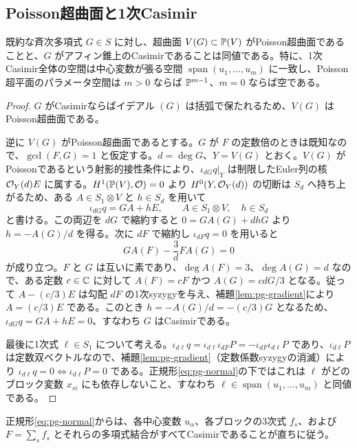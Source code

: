 \subsection{Poisson超曲面と1次Casimir}
\begin{proposition}\label{prop:pg-casimir}
既約な斉次多項式 $G\in S$ に対し、超曲面 $V(G)\subset\mathbb P(V)$ がPoisson超曲面であることと、$G$ がアフィン錐上のCasimirであることは同値である。特に、1次Casimir全体の空間は中心変数が張る空間 $\operatorname{span}(u_1,\ldots,u_m)$ に一致し、Poisson超平面のパラメータ空間は $m>0$ ならば $\mathbb P^{m-1}$、$m=0$ ならば空である。
\end{proposition}
\begin{proof}
$G$ がCasimirならばイデアル $(G)$ は括弧で保たれるため、$V(G)$ はPoisson超曲面である。

逆に $V(G)$ がPoisson超曲面であるとする。$G$ が $F$ の定数倍のときは既知なので、$\gcd(F,G)=1$ と仮定する。$d=\deg G$、$Y=V(G)$ とおく。$V(G)$ がPoissonであるという射影的接性条件により、$\iota_{dG}q|_Y$ は制限したEuler列の核 $\mathcal O_Y(d)E$ に属する。$H^1(\mathbb P(V),\mathcal O)=0$ より $H^0(Y,\mathcal O_Y(d))$ の切断は $S_d$ へ持ち上がるため、ある $A\in S_1\otimes V$ と $h\in S_d$ を用いて
\begin{equation}
\iota_{dG}q=GA+hE, \qquad A\in S_1\otimes V, \quad h\in S_d
\end{equation}
と書ける。この両辺を $dG$ で縮約すると $0=GA(G)+dhG$ より $h=-A(G)/d$ を得る。次に $dF$ で縮約し $\iota_{dF}q=0$ を用いると
\[
  GA(F)-\frac{3}{d}FA(G)=0
\]
が成り立つ。$F$ と $G$ は互いに素であり、$\deg A(F)=3$、$\deg A(G)=d$ なので、ある定数 $c\in\mathbb C$ に対して $A(F)=cF$ かつ $A(G)=cdG/3$ となる。従って $A-(c/3)E$ は勾配 $dF$ の1次syzygyを与え、補題\ref{lem:pg-gradient}により $A=(c/3)E$ である。このとき $h=-A(G)/d=-(c/3)G$ となるため、$\iota_{dG}q=GA+hE=0$、すなわち $G$ はCasimirである。

最後に1次式 $\ell\in S_1$ について考える。$\iota_{d\ell}q=\iota_{d\ell}\iota_{dF}P=-\iota_{dF}\iota_{d\ell}P$ であり、$\iota_{d\ell}P$ は定数双ベクトルなので、補題\ref{lem:pg-gradient}（定数係数syzygyの消滅）により $\iota_{d\ell}q=0\iff\iota_{d\ell}P=0$ である。正規形\eqref{eq:pg-normal}の下ではこれは $\ell$ がどのブロック変数 $x_{si}$ にも依存しないこと、すなわち $\ell\in\operatorname{span}(u_1,\ldots,u_m)$ と同値である。
\end{proof}

正規形\eqref{eq:pg-normal}からは、各中心変数 $u_\alpha$、各ブロックの3次式 $f_s$、および $F=\sum_s f_s$ とそれらの多項式結合がすべてCasimirであることが直ちに従う。

